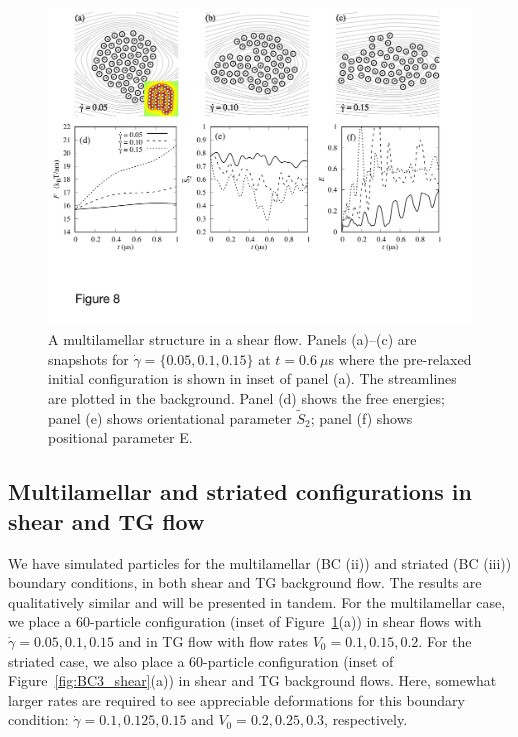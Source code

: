 \documentclass[prb,preprint,showpacs,preprintnumbers,amsmath,amssymb,longbibliography]{revtex4-1}
\begin{document}
\begin{figure}
  \begin{center}
\includegraphics[width=1.0\textwidth]{Figures/Figure8.pdf}
  \end{center}
  \vspace{-20pt}  
  \caption{\label{fig:BC2_shear} A multilamellar structure in a shear
  flow. Panels (a)--(c) are snapshots for $\dot \gamma = \{0.05, 0.1,
  0.15\}$ at $t=0.6\ \mu$s where the pre-relaxed initial configuration
  is shown in inset of panel (a). The streamlines are plotted in the
  background. Panel (d) shows the free energies; panel (e) shows
  orientational parameter $\tilde{S}_2$; panel (f) shows positional
  parameter E.}
\end{figure}






\subsection{Multilamellar and striated configurations in shear and TG flow}
We have simulated particles for the multilamellar (BC (ii)) and striated
(BC (iii)) boundary conditions, in both shear and TG background flow.
The results are qualitatively similar and will be presented in tandem.
For the multilamellar case, we place a 60-particle configuration (inset
of Figure~\ref{fig:BC2_shear}(a)) in shear flows with $\dot\gamma=0.05,
0.1, 0.15$ and in TG flow with flow rates $V_0=0.1, 0.15, 0.2$. For the
striated case, we also place a 60-particle configuration (inset of
Figure~\ref{fig:BC3_shear}(a)) in shear and TG background flows. Here,
somewhat larger rates are required to see appreciable deformations for
this boundary condition: $\dot\gamma=0.1, 0.125, 0.15$ and $V_0=0.2,
0.25, 0.3$, respectively.
\end{document}

